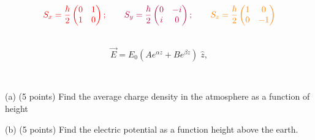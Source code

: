\documentclass{article}
\begin{document}
$$
    \color{red}
    S_x = \frac{\hbar}{2}
    \begin{pmatrix} 
    	0 & 1 \\
    	1 & 0 \\
    	\end{pmatrix}
     ; \qquad
     \color{purple}
     S_y = \frac{\hbar}{2}
     \begin{pmatrix} 
    	0 & -i \\
    	i & 0 \\
    	\end{pmatrix}
     ; \qquad
     \color{orange}
     S_z = \frac{\hbar}{2}
     \begin{pmatrix} 
    	1 & 0 \\
    	0 & -1 \\
    	\end{pmatrix}
$$

 \\
$$
\Vec{E}=E_0(Ae^{\alpha z} + Be^{\beta z})\;\hat{z},
$$

 \\
\vskip0.1in

(a) (5 points) Find the average charge density in the atmosphere as a function of height
\vskip0.1in

(b) (5 points) Find the electric potential as a function height above the earth.
\end{document}
